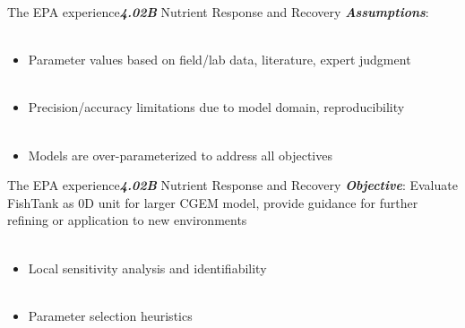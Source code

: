 \documentclass[serif]{beamer}\usepackage[]{graphicx}\usepackage[]{color}
\newcommand{\emtxt}[1]{\textbf{\textit{#1}}}
\begin{document}
\begin{frame}{The EPA experience}{\emtxt{4.02B} Nutrient Response and Recovery}
\emtxt{Assumptions}: \\~\\
\begin{itemize}
\item Parameter values based on field/lab data, literature, expert judgment \\~\\
\item Precision/accuracy limitations due to model domain, reproducibility \\~\\
\item Models are over-parameterized to address all objectives
\end{itemize}
\end{frame}

\begin{frame}{The EPA experience}{\emtxt{4.02B} Nutrient Response and Recovery}
\emtxt{Objective}: Evaluate FishTank as 0D unit for larger CGEM model, provide guidance for further refining or application to new environments \\~\\
\begin{itemize}
\item Local sensitivity analysis and identifiability \\~\\
\item Parameter selection heuristics
\end{itemize}
\end{frame}
\end{document}
